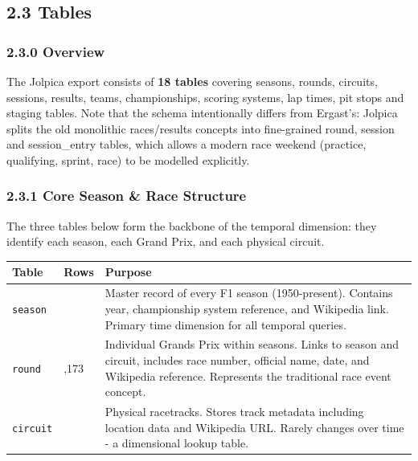 \documentclass[
]{article}
\begin{document}
\newpage

\subsection{2.3 Tables}\label{tables}

\subsubsection{2.3.0 Overview}\label{overview}

The Jolpica export consists of \textbf{18 tables} covering seasons,
rounds, circuits, sessions, results, teams, championships, scoring
systems, lap times, pit stops and staging tables. Note that the schema
intentionally differs from Ergast's: Jolpica splits the old monolithic
races/results concepts into fine-grained round, session and
session\_entry tables, which allows a modern race weekend (practice,
qualifying, sprint, race) to be modelled explicitly.

\subsubsection{2.3.1 Core Season \& Race
Structure}\label{core-season-race-structure}

The three tables below form the backbone of the temporal dimension: they
identify each season, each Grand Prix, and each physical circuit.

\begin{table}[!h]
\centering\begingroup\fontsize{9}{11}\selectfont

\begin{tabular}[t]{>{\raggedright\arraybackslash}p{4.5cm}>{\raggedright\arraybackslash}p{1.5cm}>{\raggedright\arraybackslash}p{9cm}}
\toprule
Table & Rows & Purpose\\
\midrule
\texttt{season} & 77 & Master record of every F1 season (1950-present). Contains year, championship system reference, and Wikipedia link. Primary time dimension for all temporal queries.\\
\texttt{round} & 1,173 & Individual Grands Prix within seasons. Links to season and circuit, includes race number, official name, date, and Wikipedia reference. Represents the traditional race event concept.\\
\texttt{circuit} & 78 & Physical racetracks. Stores track metadata including location data and Wikipedia URL. Rarely changes over time - a dimensional lookup table.\\
\bottomrule
\end{tabular}
\endgroup{}
\end{table}
\end{document}
